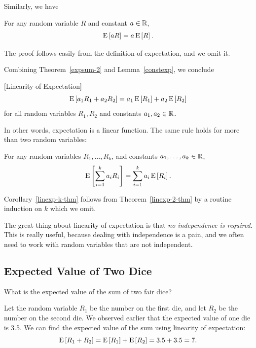 \documentclass[11pt,twoside]{article}
\begin{document}
Similarly, we have
\begin{lemma}\label{constexp}
For any random variable $R$ and constant $a \in \mathbb{R}$,
\begin{equation*}
\mathop{\textup{E}}\nolimits\left[aR\right] = a\mathop{\textup{E}}\nolimits\left[R\right].
\end{equation*}
\end{lemma}
The proof follows easily from the definition of expectation, and we omit
it.

Combining Theorem~\ref{expsum-2} and Lemma~\ref{constexp}, we conclude
\begin{theorem}\label{linexp-2-thm}[Linearity of Expectation]
\[
\mathop{\textup{E}}\nolimits\left[a_1R_1 + a_2R_2\right] = a_1\mathop{\textup{E}}\nolimits\left[R_1\right] + a_2\mathop{\textup{E}}\nolimits\left[R_2\right]
\]
for all random variables $R_1,R_2$ and constants $a_1,a_2 \in \mathbb{R}$.
\end{theorem}
In other words, expectation is a linear function.  The same rule holds
for more than two random variables:
\begin{corollary}\label{linexp-k-thm}
For any random variables $R_1, \dots, R_k$, and constants $a_1, \dots, a_k
\in \mathbb{R}$,
\[
\mathop{\textup{E}}\nolimits\left[\sum_{i=1}^k a_iR_i\right] = \sum_{i=1}^k a_i\mathop{\textup{E}}\nolimits\left[R_i\right].
\]
\end{corollary}
Corollary~\ref{linexp-k-thm} follows from Theorem~\ref{linexp-2-thm} by a
routine induction on $k$ which we omit.

The great thing about linearity of expectation is that \emph{no
independence is required}.  This is really useful, because dealing with
independence is a pain, and we often need to work with random variables
that are not independent.

\subsection{Expected Value of Two Dice}

What is the expected value of the sum of two fair dice?

Let the random variable $R_1$ be the number on the first die, and let
$R_2$ be the number on the second die.  We observed earlier that the
expected value of one die is 3.5.  We can find the expected value of the
sum using linearity of expectation:
\begin{equation*}
\mathop{\textup{E}}\nolimits\left[R_1 + R_2\right] 
 =   \mathop{\textup{E}}\nolimits\left[R_1\right] + \mathop{\textup{E}}\nolimits\left[R_2\right]
 =    3.5 + 3.5
 =    7.
\end{equation*}
\end{document}
